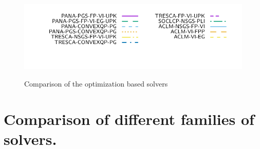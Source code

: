 \begin{figure}
{\includegraphics[height=\legendheight]{figure/OPTI/1.0e-08/50/time/profile-Chain_legend.pdf}}
 \caption{Comparison of the optimization based solvers}
  \label{fig:OPTI}
\end{figure}



\section{Comparison of different families of solvers.}
\label{Sec:Comparison}

